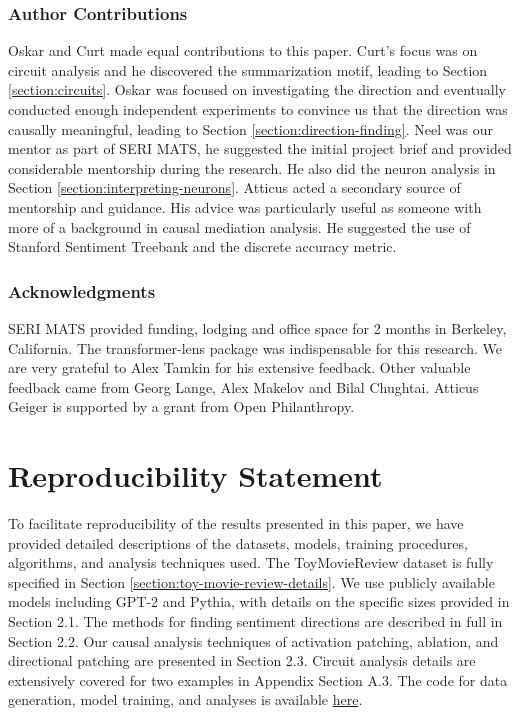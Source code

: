 \documentclass{article} %
\begin{document}


\subsubsection*{Author Contributions}
Oskar and Curt made equal contributions to this paper. Curt's focus was on circuit analysis and he discovered the summarization motif, leading to Section \ref{section:circuits}. Oskar was focused on investigating the direction and eventually conducted enough independent experiments to convince us that the direction was causally meaningful, leading to Section \ref{section:direction-finding}. Neel was our mentor as part of SERI MATS, he suggested the initial project brief and provided considerable mentorship during the research. He also did the neuron analysis in Section \ref{section:interpreting-neurons}. Atticus acted a secondary source of mentorship and guidance. His advice was particularly useful as someone with more of a background in causal mediation analysis. He suggested the use of Stanford Sentiment Treebank and the discrete accuracy metric.

\subsubsection*{Acknowledgments}
SERI MATS provided funding, lodging and office space for 2 months in Berkeley, California. The transformer-lens package \citep{nanda2022transformerlens} was indispensable for this research. We are very grateful to Alex Tamkin for his extensive feedback. Other valuable feedback came from Georg Lange, Alex Makelov and Bilal Chughtai.  Atticus Geiger is supported by a grant from Open Philanthropy.

\section*{Reproducibility Statement}
To facilitate reproducibility of the results presented in this paper, we have provided detailed descriptions of the datasets, models, training procedures, algorithms, and analysis techniques used. The ToyMovieReview dataset is fully specified in Section \ref{section:toy-movie-review-details}. We use publicly available models including GPT-2 and Pythia, with details on the specific sizes provided in Section 2.1. The methods for finding sentiment directions are described in full in Section 2.2. Our causal analysis techniques of activation patching, ablation, and directional patching are presented in Section 2.3. Circuit analysis details are extensively covered for two examples in Appendix Section A.3. The code for data generation, model training, and analyses is available \href{https://github.com/curt-tigges/eliciting-latent-sentiment}{here}.
\end{document}
